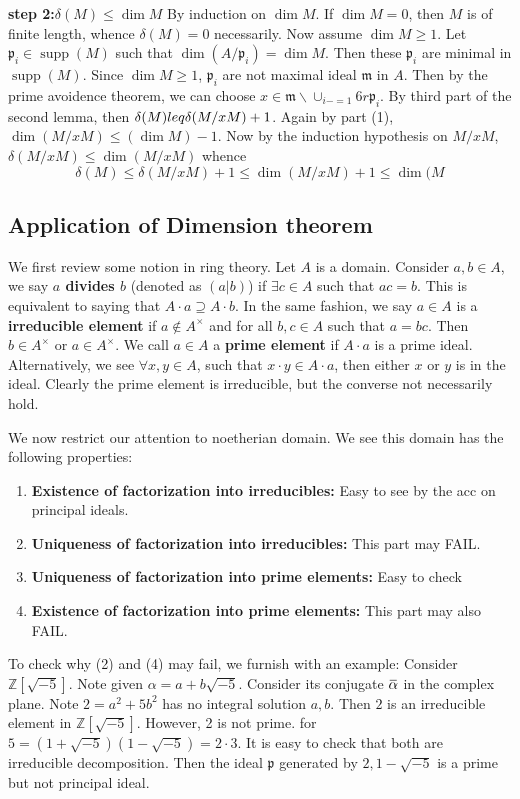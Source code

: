 \documentclass[12pt]{article}
\theoremstyle{definition}
\theoremstyle{plain}
\DeclareMathOperator{\supp}{supp}
\newcommand{\z}{\mathbb{Z}}
\newcommand{\overbar}[1]{\mkern 1.5mu\overline{\mkern-1.5mu#1\mkern-1.5mu}\mkern 1.5mu}
\renewcommand{\bar}{\overbar}
\begin{document}
\medskip
\textbf{step 2:$\delta(M)\leq \dim M$} By induction on $\dim M$. If $\dim M=0$, then $M$ is of finite length, whence $\delta(M)=0$ necessarily. Now assume $\dim M\geq 1$. Let $\mathfrak{p}_i\in \supp(M)$ such that $\dim(A/\mathfrak{p}_i)=\dim M$. Then these $\mathfrak{p}_i$ are minimal in $\supp(M)$. Since $\dim M\geq 1$, $\mathfrak{p}_i$ are not maximal ideal $\mathfrak{m}$ in $A$. Then by the prime avoidence theorem, we can choose $x\in \mathfrak{m}\backslash \cup_{i-=1}6r \mathfrak{p}_i$. By third part of the second lemma, then $\delta(M)\\leq \delta(M/xM)+1$. Again by part (1), $\dim (M/xM)\leq (\dim M)-1 $. Now by the induction hypothesis on $M/xM$, $\delta(M/xM)\leq \dim (M/xM)$ whence
\[\delta(M)\leq \delta(M/xM)+1\leq \dim(M/xM)+1\leq \dim(M\]

\subsection{Application of Dimension theorem}
We first review some notion in ring theory. Let $A$ is a domain.
\Def Consider $a, b\in A$, we say \textbf{$a$ divides $b$} (denoted as $(a|b)$) if $\exists c\in A$ such that $ac=b$. This is equivalent to saying that $A\cdot a\supseteq A\cdot b$. In the same fashion, we say $a\in A$ is a \textbf{irreducible element} if $a\notin A^\times$ and for all $b, c\in A$ such that $a=bc$. Then $b\in A^\times$ or $a\in A^\times$. We call $a\in A$ a \textbf{prime element} if $A\cdot a$ is a prime ideal. Alternatively, we see $\forall x, y\in A$, such that $x\cdot y\in A\cdot a$, then either $x$ or $y$ is in the ideal. Clearly the prime element is irreducible, but the converse not necessarily hold.

\medskip
We now restrict our attention to noetherian domain. We see this domain has the following properties:
\begin{enumerate}
  \item \textbf{Existence of factorization into irreducibles:} Easy to see by the acc on principal ideals.
  \item \textbf{Uniqueness of factorization into irreducibles:} This part may FAIL.
  \item \textbf{Uniqueness of factorization into prime elements:} Easy to check
  \item \textbf{Existence of factorization into prime elements:} This part may also FAIL.
\end{enumerate}
To check why (2) and (4) may fail, we furnish with an example: Consider $\z[\sqrt{-5}]$. Note given $\alpha=a+b\sqrt{-5}$. Consider its conjugate $\bar{\alpha}$ in the complex plane. Note $2=a^2+5b^2$ has no integral solution $a, b$. Then $2$ is an irreducible element in $\z[\sqrt{-5}]$. However, 2 is not prime. for $5=(1+\sqrt{-5})(1-\sqrt{-5})=2\cdot 3$. It is easy to check that both are irreducible decomposition. Then the ideal $\mathfrak{p}$ generated by $2, 1-\sqrt{-5}$ is a prime but not principal ideal.
\end{document}
